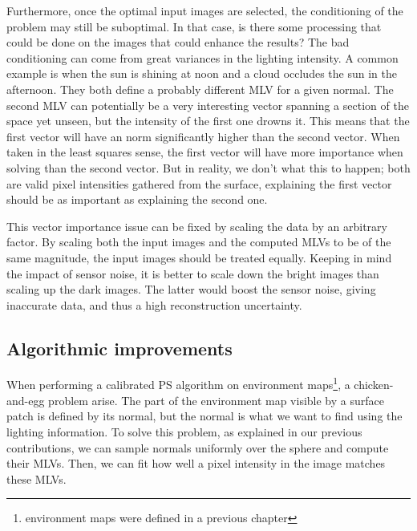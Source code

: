 Furthermore, once the optimal input images are selected, the conditioning of the problem may still be suboptimal. In that case, is there some processing that could be done on the images that could enhance the results? The bad conditioning can come from great variances in the lighting intensity. A common example is when the sun is shining at noon and a cloud occludes the sun in the afternoon. They both define a probably different MLV for a given normal. The second MLV can potentially be a very interesting vector spanning a section of the space yet unseen, but the intensity of the first one drowns it. This means that the first vector will have an norm significantly higher than the second vector. When taken in the least squares sense, the first vector will have more importance when solving than the second vector. But in reality, we don't what this to happen; both are valid pixel intensities gathered from the surface, explaining the first vector should be as important as explaining the second one.

This vector importance issue can be fixed by scaling the data by an arbitrary factor. By scaling both the input images and the computed MLVs to be of the same magnitude, the input images should be treated equally. Keeping in mind the impact of sensor noise, it is better to scale down the bright images than scaling up the dark images. The latter would boost the sensor noise, giving inaccurate data, and thus a high reconstruction uncertainty.




\subsection{Algorithmic improvements}

When performing a calibrated PS algorithm on environment maps\footnote{environment maps were defined in a previous chapter}, a chicken-and-egg problem arise. The part of the environment map visible by a surface patch is defined by its normal, but the normal is what we want to find using the lighting information. To solve this problem, as explained in our previous contributions, we can sample normals uniformly over the sphere and compute their MLVs. Then, we can fit how well a pixel intensity in the image matches these MLVs.


